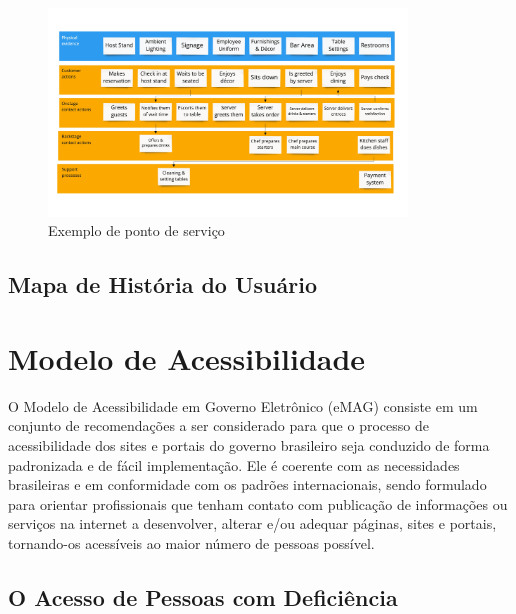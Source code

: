 \documentclass[
  12pt,
  openright,
  twoside,
  a4paper,
  english,
  french,
  spanish,
  brazil
]{abntex2}
\begin{document}
\begin{figure}[htb]
  \caption{\label{service-blueprint} Exemplo de ponto de serviço}
  \begin{center}
    \includegraphics[width=0.85\textwidth]{assets/service-blueprint.png}
  \end{center}
\end{figure}

\newpage

\section{Mapa de História do Usuário}

\chapter{Modelo de Acessibilidade}

O Modelo de Acessibilidade em Governo Eletrônico (eMAG) consiste em um conjunto
de recomendações a ser considerado para que o processo de acessibilidade dos
sites e portais do governo brasileiro seja conduzido de forma padronizada e de
fácil implementação. Ele é coerente com as necessidades brasileiras e em
conformidade com os padrões internacionais, sendo formulado para orientar
profissionais que tenham contato com publicação de informações ou serviços na
internet a desenvolver, alterar e/ou adequar páginas, sites e portais,
tornando-os acessíveis ao maior número de pessoas possível.

\section{O Acesso de Pessoas com Deficiência}
\end{document}
